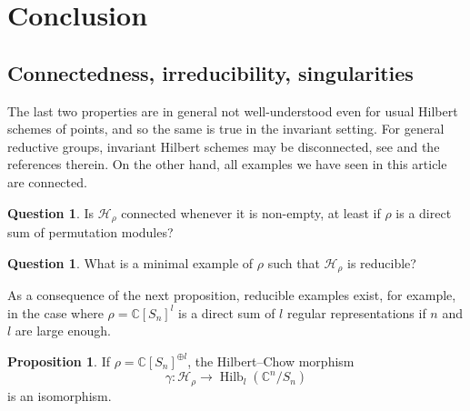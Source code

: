 \documentclass[11pt]{amsart}
\theoremstyle{definition}
\newtheorem{proposition}[theorem]{Proposition}
\newtheorem{question}[theorem]{Question}
\newcommand{\CC}{\mathbb{C}}
\newcommand{\HH}{\mathcal{H}}
\DeclareMathOperator{\Hilb}{Hilb}
\begin{document}
\section{Conclusion}\label{section:conclusion}

\subsection{Connectedness, irreducibility, singularities}
The last two properties are in general not well-understood even for usual Hilbert schemes of points, and so the same is true in the invariant setting. For general reductive groups, invariant Hilbert schemes may be disconnected, see \cite{BrionInvariantHilb} and the references therein. On the other hand, all examples we have seen in this article are connected.

\begin{question}
    Is $\HH_\rho$ connected whenever it is non-empty, at least if $\rho$ is a direct sum of permutation modules?
\end{question}

\begin{question}
    What is a minimal example of $\rho$ such that $\HH_\rho$ is reducible?
\end{question}

As a consequence of the next proposition, reducible examples exist, for example, in the case where $\rho = \CC[S_n]^l$ is a direct sum of $l$ regular representations if $n$ and $l$ are large enough.

\begin{proposition}\label{prop:HilbChowIso}
    If $\rho = \CC[S_n]^{\oplus l}$, the Hilbert--Chow morphism
    \begin{equation*}
    \gamma \colon \HH_{\rho} \longrightarrow \Hilb_{l}(\CC^n/S_n)
\end{equation*}
is an isomorphism.
\end{proposition}
\end{document}
